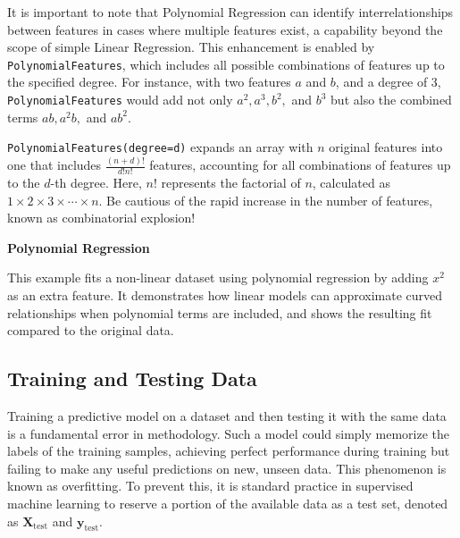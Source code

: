 \documentclass[12pt,letter]{article}
\begin{document}
It is important to note that Polynomial Regression can identify interrelationships between features in cases where multiple features exist, a capability beyond the scope of simple Linear Regression. This enhancement is enabled by \texttt{PolynomialFeatures}, which includes all possible combinations of features up to the specified degree. For instance, with two features $a$ and $b$, and a degree of 3, \texttt{PolynomialFeatures} would add not only $a^2, a^3, b^2,$ and $b^3$ but also the combined terms $ab, a^2b,$ and $ab^2$.



\begin{mdframed}[middlelinewidth=0.5mm]
\begin{center}
\end{center}
\texttt{PolynomialFeatures(degree=d)} expands an array with $n$ original features into one that includes $\frac{(n+d)!}{d!n!}$ features, accounting for all combinations of features up to the $d$-th degree. Here, $n!$ represents the factorial of $n$, calculated as $1 \times 2 \times 3 \times \cdots \times n$. Be cautious of the rapid increase in the number of features, known as combinatorial explosion!
\end{mdframed}

\begin{example}
\textbf{Polynomial Regression}

\noindent This example fits a non-linear dataset using polynomial regression by adding $x^2$ as an extra feature. It demonstrates how linear models can approximate curved relationships when polynomial terms are included, and shows the resulting fit compared to the original data.
\end{example}


\pagebreak
\subsection{Training and Testing Data}

Training a predictive model on a dataset and then testing it with the same data is a fundamental error in methodology. Such a model could simply memorize the labels of the training samples, achieving perfect performance during training but failing to make any useful predictions on new, unseen data. This phenomenon is known as overfitting. To prevent this, it is standard practice in supervised machine learning to reserve a portion of the available data as a test set, denoted as $\textbf{X}_\text{test}$ and $\textbf{y}_\text{test}$.
\end{document}
